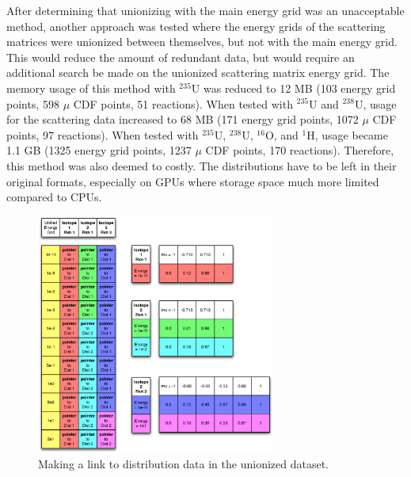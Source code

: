 After determining that unionizing with the main energy grid was an unacceptable method, another approach was tested where the energy grids of the scattering matrices were unionized between themselves, but not with the main energy grid.  This would reduce the amount of redundant data, but would require an additional search be made on the unionized scattering matrix energy grid.  The memory usage of this method with $^{235}$U was reduced to 12 MB (103 energy grid points, 598 $\mu$ CDF points, 51 reactions).  When tested with $^{235}$U and $^{238}$U, usage for the scattering data increased to 68 MB (171 energy grid points, 1072 $\mu$ CDF points, 97 reactions).  When tested with $^{235}$U, $^{238}$U, $^{16}$O, and $^{1}$H, usage became 1.1 GB (1325 energy grid points, 1237 $\mu$ CDF points, 170 reactions).  Therefore, this method was also deemed to costly.  The distributions have to be left in their original formats, especially on GPUs where storage space much more limited compared to CPUs.


\begin{figure}[h!] 
\centering
\includegraphics[width=0.7\textwidth]{graphics/unionized_pointers.eps}
\caption{Making a link to distribution data in the unionized dataset. \label{unionized_pointers} }
\end{figure}

